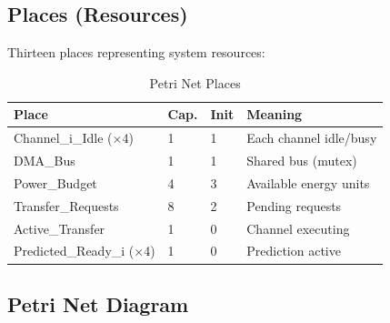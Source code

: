 \documentclass[conference]{IEEEtran}
\begin{document}
\subsection{Places (Resources)}
Thirteen places representing system resources:

\begin{table}[h]
\centering
\caption{Petri Net Places}
\label{tab:petri_places}
\begin{tabular}{llll}
\toprule
\textbf{Place} & \textbf{Cap.} & \textbf{Init} & \textbf{Meaning} \\
\midrule
Channel\_i\_Idle (×4) & 1 & 1 & Each channel idle/busy \\
DMA\_Bus & 1 & 1 & Shared bus (mutex) \\
Power\_Budget & 4 & 3 & Available energy units \\
Transfer\_Requests & 8 & 2 & Pending requests \\
Active\_Transfer & 1 & 0 & Channel executing \\
Predicted\_Ready\_i (×4) & 1 & 0 & Prediction active \\
\bottomrule
\end{tabular}
\end{table}

\subsection{Petri Net Diagram}
\end{document}
